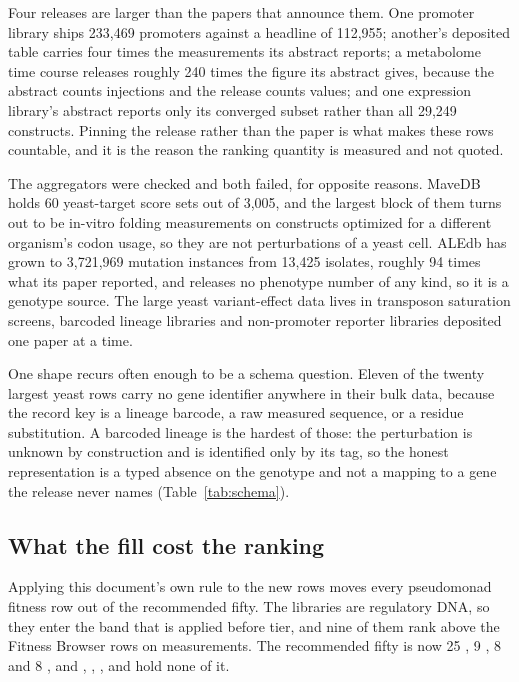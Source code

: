 Four releases are larger than the papers that announce them. One  promoter library
ships 233,469 promoters against a headline of 112,955; another's deposited table carries four
times the measurements its abstract reports; a metabolome time course releases roughly 240 times
the figure its abstract gives, because the abstract counts injections and the release counts
values; and one expression library's abstract reports only its converged subset rather than all
29,249 constructs. Pinning the release rather than the paper is what makes these rows countable,
and it is the reason the ranking quantity is measured and not quoted.

The aggregators were checked and both failed, for opposite reasons. MaveDB holds 60 yeast-target
score sets out of 3,005, and the largest block of them turns out to be in-vitro folding
measurements on constructs optimized for a different organism's codon usage, so they are not
perturbations of a yeast cell. ALEdb has grown to 3,721,969 mutation instances from 13,425
isolates, roughly 94 times what its paper reported, and releases no phenotype number of any
kind, so it is a genotype source. The large yeast variant-effect data lives in transposon
saturation screens, barcoded lineage libraries and non-promoter reporter libraries deposited one
paper at a time.

One shape recurs often enough to be a schema question. Eleven of the twenty largest yeast rows
carry no gene identifier anywhere in their bulk data, because the record key is a lineage
barcode, a raw measured sequence, or a residue substitution. A barcoded lineage is the hardest
of those: the perturbation is unknown by construction and is identified only by its tag, so the
honest representation is a typed absence on the genotype and not a mapping to a gene the release
never names (Table~\ref{tab:schema}).

\subsection{What the fill cost the ranking}\label{sec:fill-cost}

Applying this document's own rule to the new rows moves every pseudomonad fitness row out of the
recommended fifty. The  libraries are regulatory DNA, so they enter the band that
is applied before tier, and nine of them rank above the Fitness Browser rows on measurements.
The recommended fifty is now 25 , 9 , 8 
and 8 , and , , ,
 and  hold none of it.

